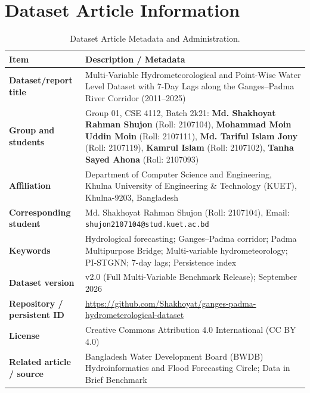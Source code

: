 \documentclass[11pt,a4paper]{article}
\begin{document}
\newpage

\section{Dataset Article Information}

\begin{table}[htbp]\centering\small
\caption{Dataset Article Metadata and Administration.}
\label{tab:article_info}
\begin{tabularx}{\linewidth}{|>{\bfseries}p{4.3cm}|X|}
\hline
\rowcolor{wordheadbg} \textbf{Item} & \textbf{Description / Metadata} \\ \hline
\cellcolor{wordkeybg}Dataset/report title & Multi-Variable Hydrometeorological and Point-Wise Water Level Dataset with 7-Day Lags along the Ganges--Padma River Corridor (2011--2025) \\ \hline
\cellcolor{wordkeybg}Group and students & Group 01, CSE 4112, Batch 2k21: \newline
\textbf{Md. Shakhoyat Rahman Shujon} (Roll: 2107104), \newline
\textbf{Mohammad Moin Uddin Moin} (Roll: 2107111), \newline
\textbf{Md. Tariful Islam Jony} (Roll: 2107119), \newline
\textbf{Kamrul Islam} (Roll: 2107102), \newline
\textbf{Tanha Sayed Ahona} (Roll: 2107093) \\ \hline
\cellcolor{wordkeybg}Affiliation & Department of Computer Science and Engineering, Khulna University of Engineering \& Technology (KUET), Khulna-9203, Bangladesh \\ \hline
\cellcolor{wordkeybg}Corresponding student & Md. Shakhoyat Rahman Shujon (Roll: 2107104), Email: \texttt{shujon2107104@stud.kuet.ac.bd} \\ \hline
\cellcolor{wordkeybg}Keywords & Hydrological forecasting; Ganges--Padma corridor; Padma Multipurpose Bridge; Multi-variable hydrometeorology; PI-STGNN; 7-day lags; Persistence index \\ \hline
\cellcolor{wordkeybg}Dataset version & v2.0 (Full Multi-Variable Benchmark Release); September 2026 \\ \hline
\cellcolor{wordkeybg}Repository / persistent ID & \url{https://github.com/Shakhoyat/ganges-padma-hydrometerological-dataset} \\ \hline
\cellcolor{wordkeybg}License & Creative Commons Attribution 4.0 International (CC BY 4.0) \\ \hline
\cellcolor{wordkeybg}Related article / source & Bangladesh Water Development Board (BWDB) Hydroinformatics and Flood Forecasting Circle; Data in Brief Benchmark \\ \hline
\end{tabularx}
\end{table}
\end{document}

